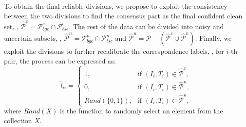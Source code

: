 \documentclass[10pt,twocolumn,letterpaper]{article}
\begin{document}
To obtain the final reliable divisions, we propose to exploit the consistency between the two divisions to find the consensus part as the final confident clean set, \ie, $\hat{\mathcal{P}}^c=\mathcal{P}^c_{bge}  \cap  \mathcal{P}^c_{tse}$. The rest of the data can be divided into noisy and uncertain subsets, \ie, $\hat{\mathcal{P}}^n=\mathcal{P}^n_{bge}  \cap  \mathcal{P}^n_{tse}$ and $\hat{\mathcal{P}}^u= \mathcal{P} - (\hat{\mathcal{P}}^c\cup  \hat{\mathcal{P}}^n)$. Finally, we exploit the divisions to further recalibrate the correspondence labels, \eg, for $i$-th pair, the process can be expressed as:
\begin{equation}\label{hl_ii}
     \hat{l}_{ii} = \left\{ \begin{array}{ll}
        1,&\text{if $(I_i,T_i) \in \hat{\mathcal{P}}^c$}, \\ 
        0,&\text{if $(I_i,T_i) \in \hat{\mathcal{P}}^n$},\\
        Rand(\{0, 1\}),&\text{if $(I_i,T_i) \in \hat{\mathcal{P}}^u$},
\end{array}\right.
\end{equation}
where $Rand(X)$ is the function to randomly select an element from the collection $X$. 
\end{document}
